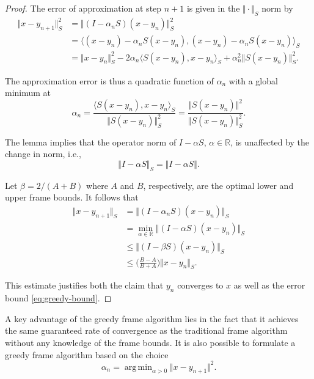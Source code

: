 \documentclass[11pt]{amsart}
\numberwithin{Theorem}{section}
\theoremstyle{definition}
\DeclareMathOperator*{\argmin}{arg\,min}
\begin{document}
\begin{proof}
The error of approximation at step $n+1$ is given in the $\Vert \cdot\Vert_{S}$ norm by
$$ \begin{aligned} \Vert x-y_{n+1} \Vert_{S}^{2} &= \Vert (I-\alpha_{n}S)(x-y_{n})\Vert_{S}^{2} \\
                                                 &= \langle (x-y_{n})-\alpha_{n}S(x-y_{n}), (x-y_{n})-\alpha_{n}S(x-y_{n})\rangle_{S} \\
                                                 &= \Vert x-y_{n}\Vert_{S}^{2} - 2\alpha_{n} \langle S(x-y_{n}),x-y_{n} \rangle_{S} + \alpha_{n}^{2} \Vert S(x-y_{n})\Vert_{S}^{2}. \end{aligned} $$

\noindent
The approximation error is thus a quadratic function of $\alpha_{n}$ with a global minimum at
$$ \alpha_{n} = \frac{\langle S(x-y_{n}),x-y_{n}\rangle_{S}}{\Vert S(x-y_{n})\Vert_{S}^{2}} = \frac{\Vert S(x-y_{n})\Vert^{2}}{\Vert S(x-y_{n})\Vert_{S}^{2}}. $$

\noindent
The lemma implies that the operator norm of $I-\alpha S$, $\alpha \in \mathbb{R}$, is unaffected by the change in norm, i.e.,
$$ \Vert I-\alpha S\Vert_{S} = \Vert I-\alpha S\Vert. $$

\noindent
Let $\beta=2/(A+B)$ where $A$ and $B$, respectively, are the optimal lower and upper frame bounds.  It follows that
$$ \begin{aligned}
   \Vert x-y_{n+1}\Vert_{S} &= \Vert (I-\alpha_{n}S)(x-y_{n})\Vert_{S} \\[1pt]
                        &= \min_{\alpha \in \mathbb{R}} \Vert (I-\alpha S)(x-y_{n})\Vert_{S} \\[1pt]
                        &\le \Vert  ( I - \beta S ) (x-y_{n}) \Vert_{S} \\[1pt]
                        &\le \big ( \tfrac{B-A}{B+A} \big ) \Vert x-y_{n} \Vert_{S}. 
   \end{aligned} $$

\noindent
This estimate justifies both the claim that $y_{n}$ converges to $x$ as well as the error bound \eqref{eq:greedy-bound}.
\end{proof}


A key advantage of the greedy frame algorithm lies in the fact that it achieves the same guaranteed rate of convergence as the traditional frame algorithm without any knowledge of the frame bounds.  It is also possible to formulate a greedy frame algorithm based on the choice
$$ \alpha_{n} = \argmin_{\alpha >0} \Vert x-y_{n+1} \Vert^{2}. $$
\end{document}
